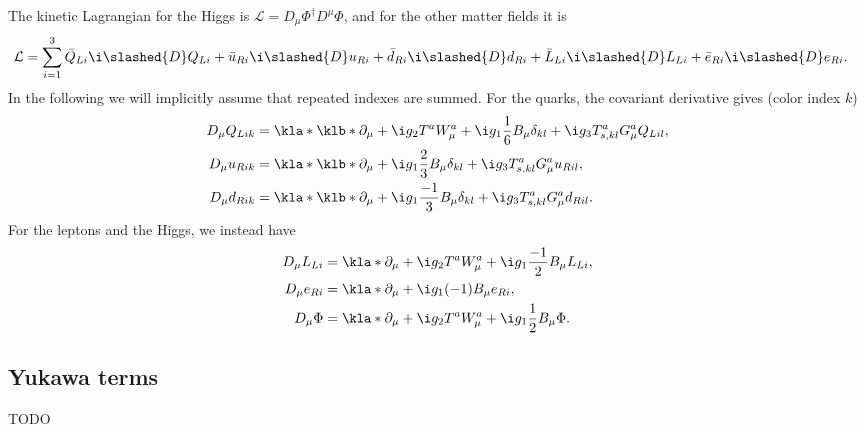 \documentclass[english, parskip=full]{scrbook}
\begin{document}
The kinetic Lagrangian for the Higgs is $\mathcal{L} = D_\mu \Phi^\dagger D^\mu\Phi$, and for the other matter fields it is
\begin{align}
\mathcal{L} &= \sum_{i=1}^3 \bar{Q}_{Li} \i\slashed{D}Q_{Li} + \bar{u}_{Ri} \i\slashed{D}u_{Ri} + \bar{d}_{Ri} \i\slashed{D}d_{Ri} + \bar{L}_{Li} \i\slashed{D}L_{Li} + \bar{e}_{Ri} \i\slashed{D}e_{Ri}.
\end{align}
In the following we will implicitly assume that repeated indexes are summed.
For the quarks, the covariant derivative gives (color index $k$)
\begin{align}
D_\mu Q_{Lik} &= \kla*{\klb*{\partial_\mu + \i g_2 T^a W^a_\mu + \i g_1 \frac{1}{6} B_\mu } \delta_{kl} + \i g_3 T^a_{s,kl} G^a_\mu} Q_{Lil},\\
D_\mu u_{Rik} &= \kla*{\klb*{\partial_\mu + \i g_1 \frac{2}{3} B_\mu } \delta_{kl} + \i g_3 T^a_{s,kl} G^a_\mu} u_{Ril},\\
D_\mu d_{Rik} &= \kla*{\klb*{\partial_\mu + \i g_1 \frac{-1}{3} B_\mu } \delta_{kl} + \i g_3 T^a_{s,kl} G^a_\mu} d_{Ril}.
\end{align}
For the leptons and the Higgs, we instead have
\begin{align}
D_\mu L_{Li} &= \kla*{\partial_\mu + \i g_2 T^a W^a_\mu + \i g_1 \frac{-1}{2} B_\mu} L_{Li},\\
D_\mu e_{Ri} &= \kla*{\partial_\mu + \i g_1 (-1) B_\mu} e_{Ri},\\
D_\mu \Phi &= \kla*{\partial_\mu + \i g_2 T^a W^a_\mu + \i g_1 \frac{1}{2} B_\mu} \Phi.
\end{align}
\subsection{Yukawa terms}
TODO
\end{document}
